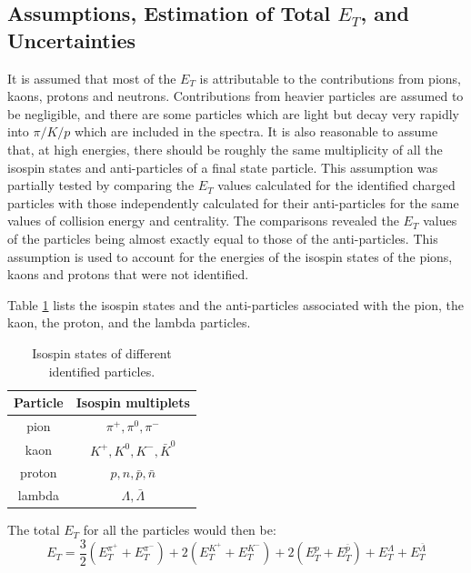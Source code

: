 \subsection{Assumptions, Estimation of Total $E_{T}$, and Uncertainties}\label{totalET}
It is assumed that most of the $E_{T}$ is attributable to the contributions from pions, kaons, protons and neutrons. Contributions from heavier particles are assumed to be negligible, and there are some particles which are light but decay very rapidly into $\pi/K/p$ which are included in the spectra. It is also reasonable to assume that, at high energies, there should be roughly the same multiplicity of all the isospin states and anti-particles of a final state particle. This assumption was partially tested by comparing the $E_{T}$ values calculated for the identified charged particles with those independently calculated for their anti-particles for the same values of collision energy and centrality. The comparisons revealed the $E_{T}$ values of the particles being almost exactly equal to those of the anti-particles. This assumption is used to account for the energies of the isospin states of the pions, kaons and protons that were not identified.

Table \ref{table:isospinStates} lists the isospin states and the anti-particles associated with the pion, the kaon, the proton, and the lambda particles.
	\begin{table}[h!]
	\centering
	\begin{tabular}{|c c|}
	\hline
	Particle & Isospin multiplets \\ [0.5ex]
	\hline
	\hline
	pion & $\pi^{+}, \pi^{0}, \pi^{-} $ \\
	kaon & $K^{+}, K^{0}, K^{-}, \bar{K}^{0}$ \\
	proton & $p, n, \bar{p}, \bar{n}$  \\
	lambda & $\Lambda, \bar{\Lambda}$  \\ [1ex]
	\hline
	\end{tabular}
	\caption{Isospin states of different identified particles.}
	\label{table:isospinStates}
	\end{table}
	
The total $E_{T}$ for all the particles would then be:	
	\begin{equation}\label{eqn:TotET}
	E_{T} = \frac{3}{2}(E_{T}^{\pi^{+}}+E_{T}^{\pi^{-}}) + 2(E_{T}^{K^{+}}+E_{T}^{K^{-}}) + 2(E_{T}^{p}+E_{T}^{\bar{p}}) + E_{T}^{\Lambda} + E_{T}^{\bar{\Lambda}}
	\end{equation}
	

